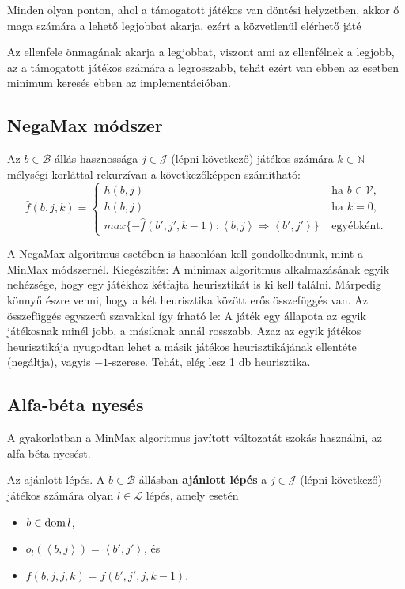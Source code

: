 Minden olyan ponton, ahol a támogatott játékos van döntési helyzetben, akkor ő maga
számára a lehető legjobbat akarja, ezért a közvetlenül elérhető játé

Az ellenfele önmagának akarja a legjobbat, viszont ami az ellenfélnek a legjobb, az a
támogatott játékos számára a legrosszabb, tehát ezért van ebben az esetben minimum
keresés ebben az implementációban.

\subsection{NegaMax módszer}

Az $b \in \mathcal{B}$ állás hasznossága $j \in \mathcal{J}$ (lépni következő)
játékos számára $k \in \mathbb{N}$ mélységi korláttal rekurzívan a következőképpen
számítható: \[
    \hat{f} (b, j, k) = \begin{cases}
        h(b,j) & \text{ ha } b \in \mathcal{V},\\
        h(b,j) & \text{ ha } k = 0,\\
        max \{
            -\hat{f}(b', j', k-1) : \left<b,j \right> \Rightarrow \left<b',j' \right>
        \}
               & \text{ egyébként.}
    \end{cases}
\]

A NegaMax algoritmus esetében is hasonlóan kell gondolkodnunk, mint a MinMax
módszernél.  Kiegészítés: A minimax algoritmus alkalmazásának egyik nehézsége,
hogy egy játékhoz kétfajta heurisztikát is ki kell találni. Márpedig könnyű
észre venni, hogy a két heurisztika között erős összefüggés van. Az összefüggés
egyszerű szavakkal így írható le: A játék egy állapota az egyik játékosnak
minél jobb, a másiknak annál rosszabb. Azaz az egyik játékos heurisztikája
nyugodtan lehet a másik játékos heurisztikájának ellentéte (negáltja), vagyis
$-1$-szerese. Tehát, elég lesz 1 db heurisztika.

\subsection{Alfa-béta nyesés}

A gyakorlatban a MinMax algoritmus javított változatát szokás használni, az
alfa-béta nyesést.

\begin{definicio}
    Az ajánlott lépés.  A $b \in \mathcal{B}$ állásban {\bf ajánlott lépés} a
    $j \in \mathcal{J}$
    (lépni következő) játékos számára olyan $l \in \mathcal{L}$ lépés, amely esetén
    \begin{itemize}
        \item $b \in \operatorname{dom} l$,
        \item $o_l\left(\left<b,j \right> \right) = \left<b', j' \right>$, és
        \item $f(b,j,j,k) = f(b', j', j, k-1)$.
    \end{itemize}
\end{definicio}

